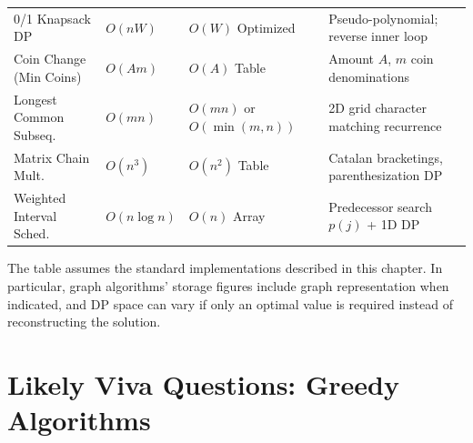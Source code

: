 \begin{table}[htbp]
\begin{tabularx}{\textwidth}{p{4.2cm} p{3.2cm} p{3.2cm} X}
0/1 Knapsack DP & $O(nW)$ & $O(W)$ Optimized & Pseudo-polynomial; reverse inner loop \\
Coin Change (Min Coins) & $O(Am)$ & $O(A)$ Table & Amount $A$, $m$ coin denominations \\
Longest Common Subseq. & $O(mn)$ & $O(mn)$ or $O(\min(m,n))$ & 2D grid character matching recurrence \\
Matrix Chain Mult. & $O(n^3)$ & $O(n^2)$ Table & Catalan bracketings, parenthesization DP \\
Weighted Interval Sched. & $O(n \log n)$ & $O(n)$ Array & Predecessor search $p(j)$ + 1D DP \\
\bottomrule
\end{tabularx}
\end{table}

The table assumes the standard implementations described in this chapter. In particular, graph algorithms' storage figures include graph representation when indicated, and DP space can vary if only an optimal value is required instead of reconstructing the solution.


\section{Likely Viva Questions: Greedy Algorithms}

